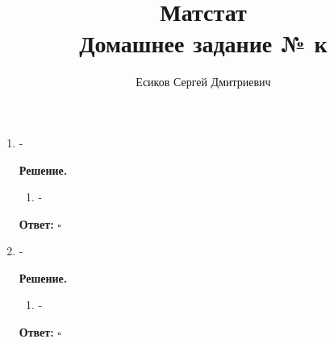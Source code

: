 \documentclass[12pt]{article}
\title{\textbf{Матстат}\\Домашнее задание № к }
\author{Есиков Сергей Дмитриевич}
\newenvironment{solution}{\textbf{Решение.}\par}{\hfill\(\square\)}
\newcommand{\answer}[1]{\textbf{Ответ:} \boxed{#1}}
\begin{document}
\maketitle

\begin{enumerate}[label=\textbf{\arabic*.}, left=0pt]
    \item -
          
    \begin{solution}
              \begin{enumerate}
                  \item -
              \end{enumerate}
              \answer{-}
          \end{solution}
    
    \item -
          
    \begin{solution}
              \begin{enumerate}
                  \item -
              \end{enumerate}
              \answer{-}
          \end{solution}
\end{enumerate}
\end{document}
